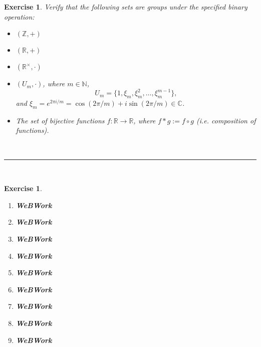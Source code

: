 \documentclass[a4paper,12pt]{report}
\newcommand{\ra}{\longrightarrow}
\newcounter{statement}
\numberwithin{statement}{chapter}
\newtheorem{ex}[statement]{\bf Exercise}
\numberwithin{equation}{chapter}
\numberwithin{section}{chapter}
\numberwithin{subsection}{section}
\begin{document}
\begin{ex}
Verify that the following sets are groups under the specified binary operation:
\begin{itemize}
\item 
$(\mathbb{Z}, +)$
  
\item 
$(\mathbb{R}, +)$
  
\item 
$(\mathbb{R}^\times, \cdot)$
  
\item 
$(U_m, \cdot)$, where $m \in \mathbb{N}$,
\[U_m = \{1, \xi_m, \xi_m^2, \ldots, \xi_m^{m - 1}\},\]
and
$\xi_m = e^{2\pi i/m} = \cos(2\pi/m) + i\sin(2\pi/m) \in \mathbb{C}$.


  
\item 
The set of bijective functions $f: \mathbb{R} \ra \mathbb{R}$,
where $f * g:= f \circ g$ (i.e. composition of functions).
  \end{itemize}





\quad\\\hrule
\quad\\


\end{ex}

\begin{ex}
\begin{enumerate}
\item 

{\bf WeBWork}

\item 

{\bf WeBWork}

\item 

{\bf WeBWork}

\item 

{\bf WeBWork}

\item 

{\bf WeBWork}

\item 

{\bf WeBWork}

\item 

{\bf WeBWork}

\item 

{\bf WeBWork}

\item 

{\bf WeBWork}
\end{enumerate}
\end{ex}
\end{document}
